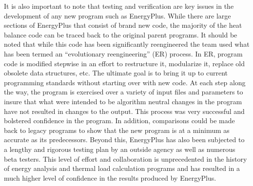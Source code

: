 It is also important to note that testing and verification are key issues in the development of any new program such as EnergyPlus. While there are large sections of EnergyPlus that consist of brand new code, the majority of the heat balance code can be traced back to the original parent programs. It should be noted that while this code has been significantly reengineered the team used what has been termed an ``evolutionary reengineering'' (ER) process. In ER, program code is modified stepwise in an effort to restructure it, modularize it, replace old obsolete data structures, etc. The ultimate goal is to bring it up to current programming standards without starting over with new code. At each step along the way, the program is exercised over a variety of input files and parameters to insure that what were intended to be algorithm neutral changes in the program have not resulted in changes to the output. This process was very successful and bolstered confidence in the program. In addition, comparisons could be made back to legacy programs to show that the new program is at a minimum as accurate as its predecessors. Beyond this, EnergyPlus has also been subjected to a lengthy and rigorous testing plan by an outside agency as well as numerous beta testers. This level of effort and collaboration is unprecedented in the history of energy analysis and thermal load calculation programs and has resulted in a much higher level of confidence in the results produced by EnergyPlus.
